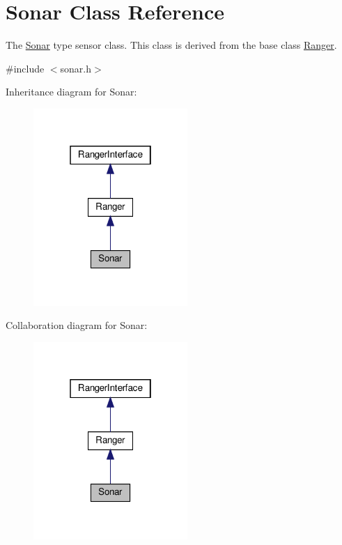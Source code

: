 \hypertarget{classSonar}{}\section{Sonar Class Reference}
\label{classSonar}


The \hyperlink{classSonar}{Sonar} type sensor class. This class is derived from the base class \hyperlink{classRanger}{Ranger}.  




{\ttfamily \#include $<$sonar.\+h$>$}



Inheritance diagram for Sonar\+:\nopagebreak
\begin{figure}[H]
\begin{center}
\leavevmode
\includegraphics[width=166pt]{classSonar__inherit__graph}
\end{center}
\end{figure}


Collaboration diagram for Sonar\+:\nopagebreak
\begin{figure}[H]
\begin{center}
\leavevmode
\includegraphics[width=166pt]{classSonar__coll__graph}
\end{center}
\end{figure}
